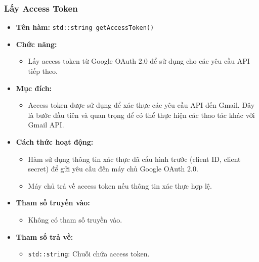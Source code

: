 \subsubsection{Lấy Access Token}
\begin{itemize}
    \item \textbf{Tên hàm:} \texttt{std::string getAccessToken()}
    \item \textbf{Chức năng:} 
    \begin{itemize}
        \item Lấy access token từ Google OAuth 2.0 để sử dụng cho các yêu cầu API tiếp theo.
    \end{itemize}
    \item \textbf{Mục đích:} 
    \begin{itemize}
        \item Access token được sử dụng để xác thực các yêu cầu API đến Gmail. Đây là bước đầu tiên và quan trọng để có thể thực hiện các thao tác khác với Gmail API.
    \end{itemize}
    \item \textbf{Cách thức hoạt động:} 
    \begin{itemize}
        \item Hàm sử dụng thông tin xác thực đã cấu hình trước (client ID, client secret) để gửi yêu cầu đến máy chủ Google OAuth 2.0.
        \item Máy chủ trả về access token nếu thông tin xác thực hợp lệ.
    \end{itemize}
    \item \textbf{Tham số truyền vào:} 
    \begin{itemize}
        \item Không có tham số truyền vào.
    \end{itemize}
    \item \textbf{Tham số trả về:} 
    \begin{itemize}
        \item \texttt{std::string}: Chuỗi chứa access token.
    \end{itemize}
\end{itemize}

